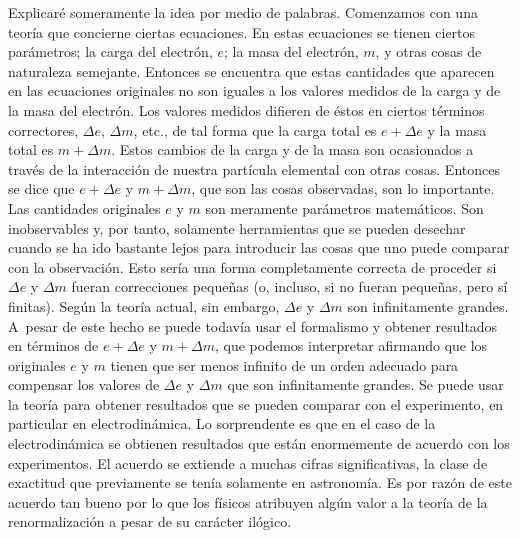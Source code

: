 \documentclass[a4paper, 12pt]{article}
\begin{document}
Explicaré someramente la idea por medio de palabras. Comenzamos con una teoría que concierne ciertas ecuaciones. En estas ecuaciones se tienen ciertos parámetros; la carga del electrón, $e$; la masa del electrón, $m$, y otras cosas de naturaleza semejante. Entonces se encuentra que estas cantidades que aparecen en las ecuaciones originales no son iguales a los valores medidos de la carga y de la masa del electrón. Los valores medidos difieren de éstos en ciertos términos correctores, $\Delta e$, $\Delta m$, etc., de tal forma que la carga total es $e +\Delta e$ y la masa total es $m+\Delta m$. Estos cambios de la carga y de la masa son ocasionados a través de la interacción de nuestra partícula elemental con otras cosas. Entonces se dice que $e +\Delta e$ y $m + \Delta m$, que son las cosas observadas, son lo importante. Las cantidades originales $e$ y $m$ son meramente parámetros matemáticos. Son inobservables y, por tanto, solamente herramientas que se pueden desechar cuando se ha ido bastante lejos para introducir las cosas que uno puede comparar con la observación. Esto sería una forma completamente correcta de proceder si $\Delta e$ y $\Delta m$ fueran correcciones pequeñas (o, incluso, si no fueran pequeñas, pero sí finitas). Según la teoría actual, sin embargo, $\Delta e$ y $\Delta m$ son infinitamente grandes. A~pesar de este hecho se puede todavía usar el formalismo y obtener resultados en términos de $e +\Delta e$ y $m + \Delta m$, que podemos interpretar afirmando que los originales $e$ y $m$ tienen que ser menos infinito de un orden adecuado para compensar los valores de $\Delta e$ y $\Delta m$ que son infinitamente grandes. Se puede usar la teoría para obtener resultados que se pueden comparar con el experimento, en particular en electrodinámica. Lo sorprendente es que en el caso de la electrodinámica se obtienen resultados que están enormemente de acuerdo con los experimentos. El acuerdo se extiende a muchas cifras significativas, la clase de exactitud que previamente se tenía solamente en astronomía. Es por razón de este acuerdo tan bueno por lo que los físicos atribuyen algún valor a la teoría de la renormalización a pesar de su carácter ilógico.
\end{document}
